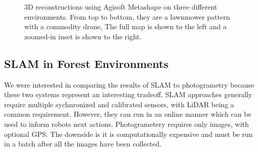 \begin{figure}[H]
    \hfill
    \caption{3D reconstructions using Agisoft Metashape on three different environments. From top to bottom, they are a lawnmower pattern with a commodity drone,  The full map is shown to the left and a zoomed-in inset is shown to the right.}
    \label{fig:results:sfm}
\end{figure}


\subsection{SLAM in Forest Environments}
We were interested in comparing the results of SLAM to photogrametry because these two systems represent an interesting tradeoff. SLAM approaches generally require multiple sychnronized and calibrated sensors, with LiDAR being a common requirement. However, they can run in an online manner which can be used to inform robots next actions. Photogrametery requires only images, with optional GPS. The downside is it is computationally expensive and must be run in a batch after all the images have been collected.

